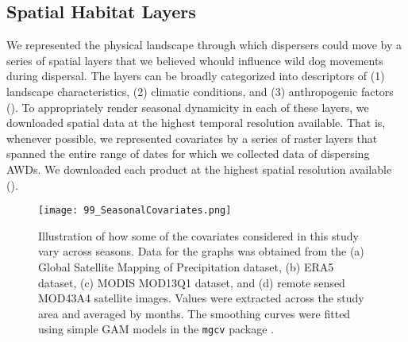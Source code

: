 \documentclass[abstract=on,10pt,a4paper,bibliography=totocnumbered]{article}
\newcommand{\inputy}[1]{\unskip}
\begin{document}
\subsection{Spatial Habitat Layers}
We represented the physical landscape through which dispersers could move by a
series of spatial layers that we believed whould influence wild dog movements
during dispersal. The layers can be broadly categorized into descriptors of (1)
landscape characteristics, (2) climatic conditions, and (3) anthropogenic
factors (). To appropriately render seasonal dynamicity in
each of these layers, we downloaded spatial data at the highest temporal
resolution available. That is, whenever possible, we represented covariates by a
series of raster layers that spanned the entire range of dates for which we
collected data of dispersing AWDs. We downloaded each product at the highest
spatial resolution available ().

\begin{figure}
 \begin{center}
  \texttt{[image: 99\_SeasonalCovariates.png]}
  \caption{Illustration of how some of the covariates considered in this study
  vary across seasons. Data for the graphs was obtained from the (a) Global
  Satellite Mapping of Precipitation dataset, (b) ERA5 dataset, (c) MODIS
  MOD13Q1 dataset, and (d) remote sensed MOD43A4 satellite images. Values were
  extracted across the study area and averaged by months. The smoothing curves
  were fitted using simple GAM models in the \texttt{mgcv} package
  \citep{Wood.2011}.}
  \label{Seasonality}
 \end{center}
\end{figure}

\inputy{99_Covariates.tex}
\end{document}
